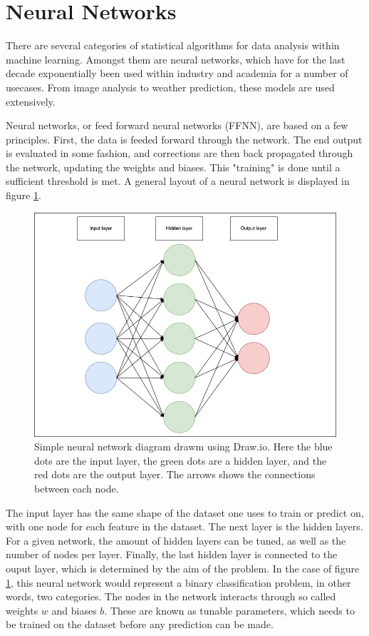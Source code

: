 \section*{Neural Networks}
There are several categories of statistical algorithms for data analysis within machine learning.
Amongst them are neural networks, which have for the last decade exponentially been used
within industry and academia for a number of usecases. From image analysis to weather prediction,
these models are used extensively. \par
Neural networks, or feed forward neural networks (FFNN), are based on a few principles.
First, the data is feeded forward through the network. The end output is evaluated in some fashion, 
and corrections are then back propagated through the network, updating the weights and biases. 
This "training" is done until a sufficient threshold is met. A general layout of a neural network is displayed in
figure \ref{fig:nndiagram}.

\begin{figure}
    \includegraphics[width=\linewidth]{Figures/Machinelearning/nn_diagram.jpeg}
    \caption{Simple neural network diagram drawm using Draw.io. Here the blue dots are the input layer, the green dots are a hidden layer, 
    and the red dots are the output layer. The arrows shows the connections between each node. }
    \label{fig:nndiagram}
\end{figure}

The input layer has the same shape of the dataset one uses to train or predict on, with one node for each feature in the dataset.
The next layer is the hidden layers. For a given network, the amount of hidden layers can be tuned, as well as the number of 
nodes per layer. Finally, the last hidden layer is connected to the ouput layer, which is determined by the aim of the problem. 
In the case of figure \ref{fig:nndiagram}, this neural network would represent a binary classification problem, in other words, two categories. 
The nodes in the network interacts through so called weights $w$ and biases $b$. These are known as tunable parameters, 
which needs to be trained on the dataset before any prediction can be made. 


